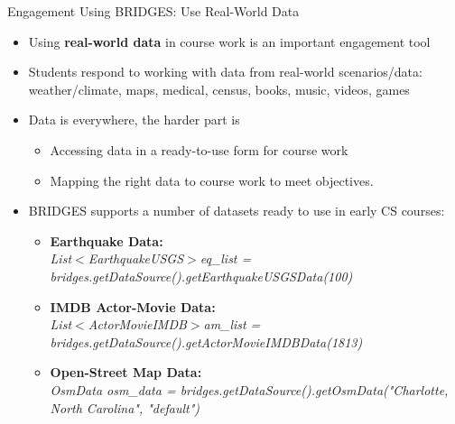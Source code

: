 \documentclass[aspectratio=169]{beamer}
\begin{document}
%
\begin{frame}{Engagement Using BRIDGES: Use Real-World Data}

\begin{itemize}
\item Using \textbf{real-world data} in course work is an important engagement tool
\item Students respond to working with data from real-world scenarios/data:
	weather/climate, maps, medical, census, books, music, videos, games
\item Data is everywhere, the harder part is 
	\begin{itemize}
		\item Accessing data in a ready-to-use form for course work
		\item Mapping the right data to course work to meet objectives.
	\end{itemize}
\item BRIDGES supports a number of datasets ready to use in early CS courses:
	\begin{itemize}
	\item \textbf{Earthquake Data:} \\
		\textsl{List$<$EarthquakeUSGS$>$eq\_list = bridges.getDataSource().getEarthquakeUSGSData(100) }
	\item \textbf{IMDB Actor-Movie Data:}\\
		\textsl{List$<$ActorMovieIMDB$>$am\_list} \textsl{= bridges.getDataSource().getActorMovieIMDBData(1813) }
	\item \textbf{Open-Street Map Data:}\\
		\textsl{OsmData osm\_data = bridges.getDataSource().getOsmData("Charlotte, North Carolina", "default")}

	\end{itemize}
\end{itemize}
\end{frame}
\end{document}
